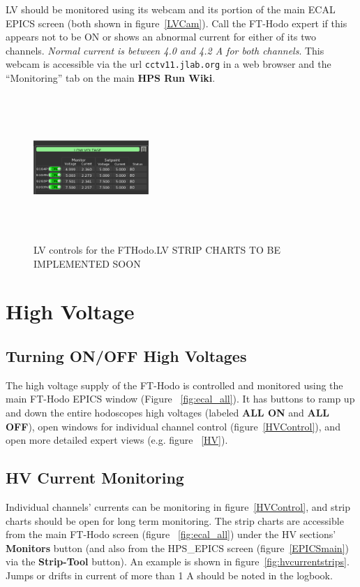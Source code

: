 \documentclass[12pt]{article}
\begin{document}
LV should be monitored using its webcam and its portion of the main ECAL EPICS screen (both shown in figure~\ref{LVCam}). Call the FT-Hodo expert if this appears not to be ON or shows an abnormal current for either of its two channels.  {\em Normal current is between 4.0 and 4.2 A for both channels}.  This webcam is accessible via the url \texttt{cctv11.jlab.org} in a web browser and the ``Monitoring'' tab on the main {\bf HPS Run Wiki}.

\begin{figure}[htbp]
\center

\includegraphics[width=0.39\textwidth,height=5.5cm]{Images/LV.png}
\caption{ LV controls for the FTHodo.LV STRIP CHARTS TO BE IMPLEMENTED SOON}
\end{figure}

\section{High Voltage}
      \subsection{Turning ON/OFF High Voltages}

      The high voltage supply of the FT-Hodo is controlled and monitored using the main FT-Hodo
EPICS window (Figure ~\ref{fig:ecal_all}).  It has buttons to ramp up and down the entire 
hodoscopes high voltages (labeled {\bf ALL ON} and {\bf ALL OFF}), open windows for
individual channel control (figure~\ref{HVControl}), and open more detailed expert views 
(e.g. figure ~\ref{HV}).

   \subsection{HV Current Monitoring}
   Individual channels' currents can be monitoring in figure~\ref{HVControl}, and strip charts should be open for long term monitoring.  The strip charts are accessible from the main FT-Hodo screen (figure ~\ref{fig:ecal_all}) under the HV sections' {\bf Monitors} button (and also from the HPS\_EPICS screen (figure~\ref{EPICSmain}) via the {\bf Strip-Tool} button).  An example is shown in figure~\ref{fig:hvcurrentstrips}.  Jumps or drifts in current of more than 1 A should be noted in the logbook.
   
\end{document}
